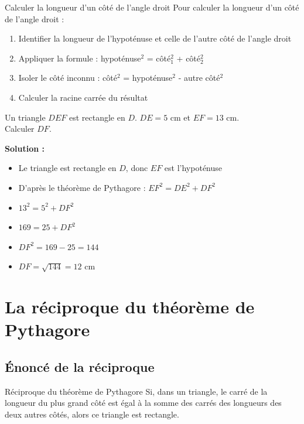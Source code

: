 \begin{methode}{Calculer la longueur d'un côté de l'angle droit}
Pour calculer la longueur d'un côté de l'angle droit :
\begin{enumerate}
    \item Identifier la longueur de l'hypoténuse et celle de l'autre côté de l'angle droit
    \item Appliquer la formule : hypoténuse$^2$ = côté$_1^2$ + côté$_2^2$
    \item Isoler le côté inconnu : côté$^2$ = hypoténuse$^2$ - autre côté$^2$
    \item Calculer la racine carrée du résultat
\end{enumerate}
\end{methode}

\begin{exemple}
Un triangle $DEF$ est rectangle en $D$. $DE = 5$ cm et $EF = 13$ cm.\\
Calculer $DF$.

\textbf{Solution :}
\begin{itemize}
    \item Le triangle est rectangle en $D$, donc $EF$ est l'hypoténuse
    \item D'après le théorème de Pythagore : $EF^2 = DE^2 + DF^2$
    \item $13^2 = 5^2 + DF^2$
    \item $169 = 25 + DF^2$
    \item $DF^2 = 169 - 25 = 144$
    \item $DF = \sqrt{144} = 12$ cm
\end{itemize}
\end{exemple}

\section{La réciproque du théorème de Pythagore}

\subsection{Énoncé de la réciproque}

\begin{propriete}{Réciproque du théorème de Pythagore}
Si, dans un triangle, le carré de la longueur du plus grand côté est égal à la somme des carrés des longueurs des deux autres côtés, alors ce triangle est rectangle.
\end{propriete}


